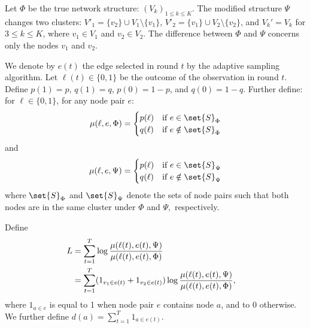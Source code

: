 Let $\Phi$ be the true
network structure: $(V_k )_{1\le k \le K}$. The modified structure $\Psi$ changes two
clusters: ${V}'_1 = \{v_2 \} \cup V_1 \setminus \{v_1 \}$, ${V}'_2
= \{v_1 \} \cup V_2 \setminus \{ v_2 \}$, and $V_k' = V_k$ for $3\le k
\le K$, where $v_1 \in V_1$ and $v_2 \in V_2$. The difference between $\Phi$ and $\Psi$
concerns only the nodes $v_1$ and $v_2$. 

We denote by $e(t)$ the edge selected in round $t$ by the adaptive sampling algorithm. Let $\ell(t)\in\{0,1\}$ be the outcome of the observation in round $t$. Define $p(1)=p$, $q(1)=q$, $p(0)=1-p$, and $q(0)=1-q$. Further define: for $\ell\in \{0,1\}$, for any node pair $e$:
$$
\mu (\ell, e, \Phi) = \begin{cases} p(\ell) & \mbox{if}~e \in \set{S}_{\Phi}
  \cr q(\ell) & \mbox{if}~e \notin \set{S}_{\Phi}   \end{cases}$$
and
$$ \mu (\ell, e, \Psi) = \begin{cases} p(\ell) & \mbox{if}~e \in \set{S}_{\Psi}
  \cr q(\ell) & \mbox{if}~e \notin \set{S}_{\Psi} \end{cases}$$
where $\set{S}_{\Phi}$ and $\set{S}_{\Psi}$ denote the sets of node pairs such that both nodes are in the same cluster under $\Phi$ and $\Psi,$ respectively.

Define
\begin{align}
L &= \sum_{t=1}^{T}
  \log\frac{\mu(\ell(t),e(t),\Psi)}{\mu(\ell(t),e(t),\Phi)} \cr
&= \sum_{t=1}^{T} (1_{v_1 \in e(t)} + 1_{v_2 \in e(t)})\log\frac{\mu(\ell(t),e(t),\Psi)}{\mu(\ell(t),e(t),\Phi)} ,
\end{align}
where $1_{a \in e}$ is equal to 1 when node pair $e$ contains node $a$, and to 0 otherwise. We further define $d(a) = \sum_{t=1}^{T}1_{a \in e(t)}.$


